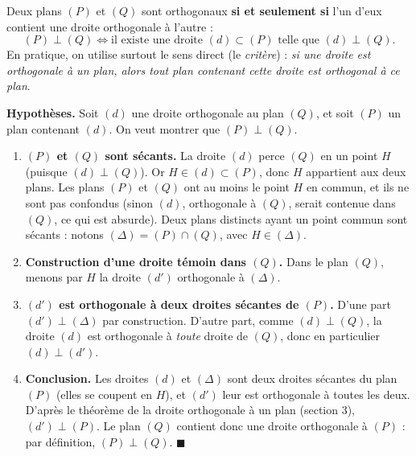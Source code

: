 \documentclass[11pt]{article}
\begin{document}
\begin{propriete}
Deux plans $(P)$ et $(Q)$ sont orthogonaux \textbf{si et seulement si} l'un d'eux contient une droite orthogonale à l'autre :
\[ (P) \perp (Q) \iff \text{il existe une droite } (d) \subset (P) \text{ telle que } (d) \perp (Q). \]
En pratique, on utilise surtout le sens direct (le \emph{critère}) : \emph{si une droite est orthogonale à un plan, alors tout plan contenant cette droite est orthogonal à ce plan}.
\end{propriete}

\begin{experience}
\textbf{Hypothèses.} Soit $(d)$ une droite orthogonale au plan $(Q)$, et soit $(P)$ un plan contenant $(d)$. On veut montrer que $(P) \perp (Q)$.

\begin{enumerate}
\item \textbf{$(P)$ et $(Q)$ sont sécants.} La droite $(d)$ perce $(Q)$ en un point $H$ (puisque $(d) \perp (Q)$). Or $H \in (d) \subset (P)$, donc $H$ appartient aux deux plans. Les plans $(P)$ et $(Q)$ ont au moins le point $H$ en commun, et ils ne sont pas confondus (sinon $(d)$, orthogonale à $(Q)$, serait contenue dans $(Q)$, ce qui est absurde). Deux plans distincts ayant un point commun sont sécants : notons $(\Delta) = (P) \cap (Q)$, avec $H \in (\Delta)$.
\item \textbf{Construction d'une droite témoin dans $(Q)$.} Dans le plan $(Q)$, menons par $H$ la droite $(d')$ orthogonale à $(\Delta)$.
\item \textbf{$(d')$ est orthogonale à deux droites sécantes de $(P)$.} D'une part $(d') \perp (\Delta)$ par construction. D'autre part, comme $(d) \perp (Q)$, la droite $(d)$ est orthogonale à \emph{toute} droite de $(Q)$, donc en particulier $(d) \perp (d')$.
\item \textbf{Conclusion.} Les droites $(d)$ et $(\Delta)$ sont deux droites sécantes du plan $(P)$ (elles se coupent en $H$), et $(d')$ leur est orthogonale à toutes les deux. D'après le théorème de la droite orthogonale à un plan (section 3), $(d') \perp (P)$. Le plan $(Q)$ contient donc une droite orthogonale à $(P)$ : par définition, $(P) \perp (Q)$. $\blacksquare$
\end{enumerate}
\end{experience}
\end{document}
